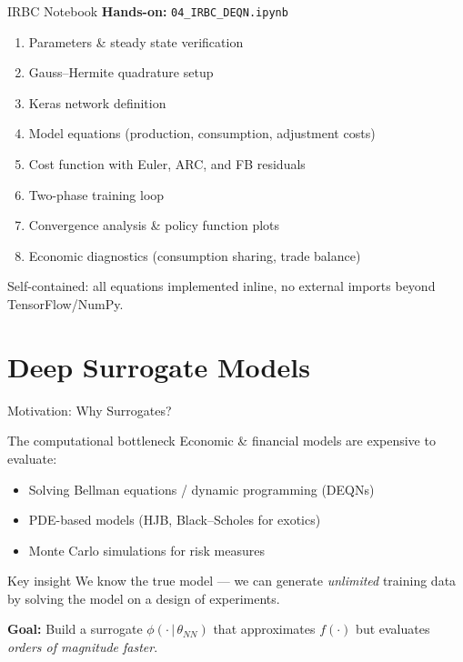 \documentclass[aspectratio=169,11pt]{beamer}
\newcommand{\emphc}[1]{\textcolor{harvardcrimson}{#1}}
\begin{document}
\begin{frame}{IRBC Notebook}
\textbf{Hands-on:} \texttt{04\_IRBC\_DEQN.ipynb}

\vspace{0.5em}
\begin{enumerate}
    \item Parameters \& steady state verification
    \item Gauss--Hermite quadrature setup
    \item Keras network definition
    \item Model equations (production, consumption, adjustment costs)
    \item Cost function with Euler, ARC, and FB residuals
    \item Two-phase training loop
    \item Convergence analysis \& policy function plots
    \item Economic diagnostics (consumption sharing, trade balance)
\end{enumerate}

\vspace{0.5em}
{\small Self-contained: all equations implemented inline, no external imports beyond TensorFlow/NumPy.}
\end{frame}



\section{Deep Surrogate Models}

\begin{frame}{Motivation: Why Surrogates?}
\begin{block}{The computational bottleneck}
Economic \& financial models are expensive to evaluate:
\begin{itemize}
  \item Solving Bellman equations / dynamic programming (DEQNs)
  \item PDE-based models (HJB, Black--Scholes for exotics)
  \item Monte Carlo simulations for risk measures
\end{itemize}
\end{block}

\vspace{0.3cm}
\begin{alertblock}{Key insight}
\emphc{We know the true model} --- we can generate \emph{unlimited} training data by solving the model on a design of experiments.
\end{alertblock}

\vspace{0.3cm}
\textbf{Goal:} Build a \emphc{surrogate} $\phi(\cdot\,|\,\theta_{NN})$ that approximates $f(\cdot)$ but evaluates \emph{orders of magnitude faster}.
\end{frame}
\end{document}
